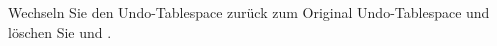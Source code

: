     \item Wechseln Sie den Undo-Tablespace zur\"uck zum Original Undo-Tablespace und l\"oschen Sie  und .
